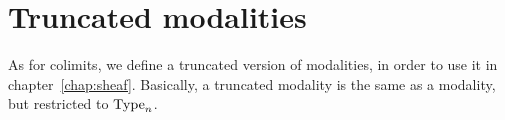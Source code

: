 



  



\section{Truncated modalities}
\label{sec:trunc_modalities}

As for colimits, we define a truncated version of modalities, in order
to use it in chapter~\ref{chap:sheaf}. Basically, a truncated modality
is the same as a modality, but restricted to $\operatorname{Type}_n$. 

